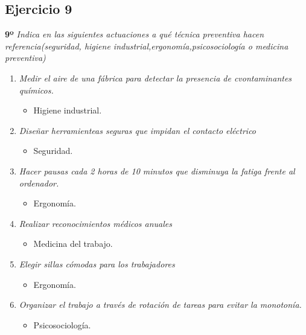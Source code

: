 \documentclass{article}
\begin{document}
        \subsection{Ejercicio 9}
          \textbf{9º}  \textit{Indica en las siguientes actuaciones a qué técnica preventiva hacen referencia(seguridad, higiene industrial,ergonomía,psicosociología o medicina preventiva)}
          \\
          \begin{enumerate}[label=(\alph*)]
            \item \textit{Medir el aire de una fábrica para detectar la presencia de cvontaminantes químicos.}
              \begin{itemize}
                \item Higiene industrial.
              \end{itemize}
            \item \textit{Diseñar herramienteas seguras que impidan el contacto eléctrico}
              \begin{itemize}
                \item Seguridad.
              \end{itemize}
            \item \textit{Hacer pausas cada 2 horas de 10 minutos que disminuya la fatiga frente al ordenador.}
              \begin{itemize}
                \item Ergonomía.
              \end{itemize}
            \item \textit{Realizar reconocimientos médicos anuales}
              \begin{itemize}
                \item Medicina del trabajo.
              \end{itemize}
            \item \textit{Elegir sillas cómodas para los trabajadores}
              \begin{itemize}
                \item Ergonomía.
              \end{itemize}
            \item \textit{Organizar el trabajo a través de rotación de tareas para evitar la monotonía.}
              \begin{itemize}
                \item Psicosociología.
              \end{itemize}
          \end{enumerate}
  \newpage
\end{document}
